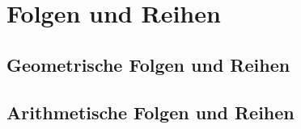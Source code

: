 \documentclass[../main.tex]{subfiles}
\begin{document}
\chapter{Folgen und Reihen}
\section{Geometrische Folgen und Reihen}
\section{Arithmetische Folgen und Reihen}
\end{document}
